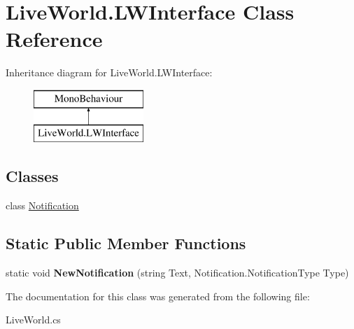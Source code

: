 \hypertarget{class_live_world_1_1_l_w_interface}{}\section{Live\+World.\+L\+W\+Interface Class Reference}
\label{class_live_world_1_1_l_w_interface}
Inheritance diagram for Live\+World.\+L\+W\+Interface\+:\begin{figure}[H]
\begin{center}
\leavevmode
\includegraphics[height=2.000000cm]{class_live_world_1_1_l_w_interface}
\end{center}
\end{figure}
\subsection*{Classes}
\begin{DoxyCompactItemize}
\item 
class \hyperlink{class_live_world_1_1_l_w_interface_1_1_notification}{Notification}
\end{DoxyCompactItemize}
\subsection*{Static Public Member Functions}
\begin{DoxyCompactItemize}
\item 
\hypertarget{class_live_world_1_1_l_w_interface_a8689c4fab2a09c5d408e395ef92514ac}{}static void {\bfseries New\+Notification} (string Text, Notification.\+Notification\+Type Type)\label{class_live_world_1_1_l_w_interface_a8689c4fab2a09c5d408e395ef92514ac}

\end{DoxyCompactItemize}


The documentation for this class was generated from the following file\+:\begin{DoxyCompactItemize}
\item 
Live\+World.\+cs\end{DoxyCompactItemize}
